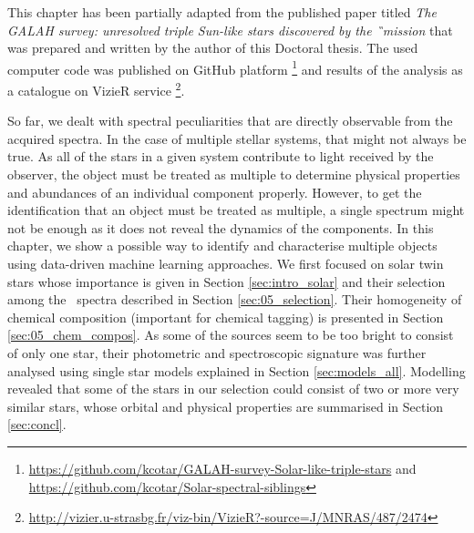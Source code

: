 This chapter has been partially adapted from the published paper titled \textit{The GALAH survey: unresolved triple Sun-like stars discovered by the \G\ mission} \cite{2019MNRAS.487.2474C} that was prepared and written by the author of this Doctoral thesis. The used computer code was published on GitHub platform  \footnote{\url{https://github.com/kcotar/GALAH-survey-Solar-like-triple-stars} and \url{https://github.com/kcotar/Solar-spectral-siblings}} and results of the analysis as a catalogue on VizieR service  \footnote{\url{http://vizier.u-strasbg.fr/viz-bin/VizieR?-source=J/MNRAS/487/2474}}.

So far, we dealt with spectral peculiarities that are directly observable from the acquired spectra. In the case of multiple stellar systems, that might not always be true. As all of the stars in a given system contribute to light received by the observer, the object must be treated as multiple to determine physical properties and abundances of an individual component properly. However, to get the identification that an object must be treated as multiple, a single spectrum might not be enough as it does not reveal the dynamics of the components. In this chapter, we show a possible way to identify and characterise multiple objects using data-driven machine learning approaches. We first focused on solar twin stars whose importance is given in Section \ref{sec:intro_solar} and their selection among the \Gh\ spectra described in Section \ref{sec:05_selection}. Their homogeneity of chemical composition (important for chemical tagging) is presented in Section \ref{sec:05_chem_compos}. As some of the sources seem to be too bright to consist of only one star, their photometric and spectroscopic signature was further analysed using single star models explained in Section \ref{sec:models_all}. Modelling revealed that some of the stars in our selection could consist of two or more very similar stars, whose orbital and physical properties are summarised in Section \ref{sec:concl}.
 

